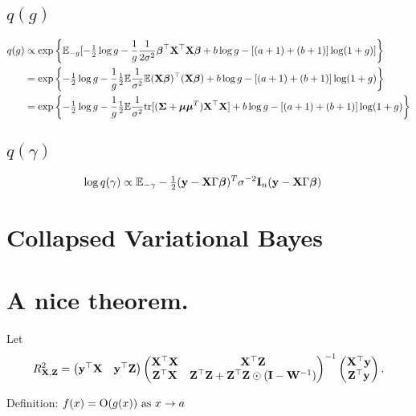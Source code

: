 \documentclass{amsart}[12pt]
\begin{document}
\subsection{$q(g)$}
\begin{align*}
q(g) &\propto \exp \left\{ \mathbb{E}_{-g} [-\tfrac{1}{2} \log g - \frac{1}{g} \frac{1}{2 \sigma^2} {\boldsymbol \beta}^\top {\bf X}^\top {\bf X} {\boldsymbol\beta} + b \log g - [(a + 1) + (b + 1)] \log(1 + g)] \right\} \\
&= \exp \left\{ -\tfrac{1}{2} \log g - \frac{1}{g} \tfrac{1}{2} \mathbb{E} \frac{1}{\sigma^2} \mathbb{E} ({\bf X} {\boldsymbol \beta})^\top ({\bf X} {\boldsymbol \beta}) + b \log g - [(a + 1) + (b + 1)] \log(1 + g) \right\} \\
&= \exp \left\{ -\tfrac{1}{2} \log g - \frac{1}{g} \tfrac{1}{2} \mathbb{E} \frac{1}{\sigma^2} \text{tr}[({\boldsymbol \Sigma} + {\boldsymbol \mu} {\boldsymbol \mu}^T) {\bf X}^\top {\bf X}] + b \log g - [(a + 1) + (b + 1)] \log(1 + g) \right\} \\
\end{align*}

\subsection{$q(\gamma)$}
\begin{align*}
\log q(\gamma) &\propto \mathbb{E}_{-\gamma} -\tfrac{1}{2} ({\bf y} - {\bf X} \Gamma {\boldsymbol\beta})^T \sigma^{-2} {\bf I}_n ({\bf y} - {\bf X} \Gamma {\boldsymbol\beta})
\end{align*}

\section{Collapsed Variational Bayes}


\section{A nice theorem.}
Let
\begin{equation*}
R^2_{{\bf X}, {\bf Z}} = 
\begin{pmatrix}
{\bf y}^\top {\bf X} & {\bf y}^\top {\bf Z}
\end{pmatrix}
\begin{pmatrix}
{\bf X}^\top {\bf X} & {\bf X}^\top {\bf Z} \\
{\bf Z}^\top {\bf X} & {\bf Z}^\top {\bf Z} + {\bf Z}^\top {\bf Z} \odot ({\bf I} - {\bf W}^{-1})
\end{pmatrix}^{-1}
\begin{pmatrix}
{\bf X}^\top {\bf y}\\
{\bf Z}^\top {\bf y}
\end{pmatrix}.
\end{equation*}

Definition:
$f(x) = \text{O}(g(x)) \text{ as } x \to a$
\end{document}
